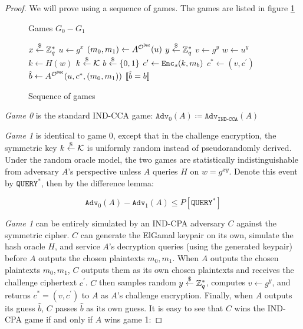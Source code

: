 \documentclass{article}
\begin{document}
\begin{proof}
    We will prove using a sequence of games. The games are listed in figure \ref{fig:cca-elgamal-sequence}

    \begin{figure}[H]
        \begin{algorithm}[H]
            \caption{Games $G_0 - G_1$}
            \begin{algorithmic}[1]
                \State $x \stackrel{\$}{\leftarrow} \mathbb{Z}_q^\ast$
                \State $u \leftarrow g^x$
                \State $(m_0, m_1) \leftarrow A^{\mathcal{O}^{\texttt{Dec}}}(u)$
                \State $y \stackrel{\$}{\leftarrow} \mathbb{Z}_q^\ast$
                \State $v \leftarrow g^y$
                \State $w \leftarrow u^y$
                \State $k \leftarrow H(w)$
                \State $k \stackrel{\$}{\leftarrow} \mathcal{K}$
                \State $b \stackrel{\$}{\leftarrow} \{0,1\}$
                \State $c^\prime \leftarrow \texttt{Enc}_s(k, m_b)$
                \State $c^\ast \leftarrow (v, c^\prime)$
                \State $\hat{b} \leftarrow A^{\mathcal{O}^{\texttt{Dec}}}(u, c^\ast, (m_0, m_1))$
                \State \Return $[\![ \hat{b} = b ]\!]$
            \end{algorithmic}
        \end{algorithm}
        \caption{Sequence of games}\label{fig:cca-elgamal-sequence}
    \end{figure}

    \emph{Game 0} is the standard IND-CCA game: $\texttt{Adv}_0(A) \coloneq \texttt{Adv}_\texttt{IND-CCA}(A)$

    \emph{Game 1} is identical to game 0, except that in the challenge encryption, the symmetric key $k \stackrel{\$}{\leftarrow} \mathcal{K}$ is uniformly random instead of pseudorandomly derived. Under the random oracle model, the two games are statistically indistinguishable from adversary $A$'s perspective unless $A$ queries $H$ on $w = g^{xy}$. Denote this event by $\texttt{QUERY}^\ast$, then by the difference lemma:

    \begin{equation*}
        \texttt{Adv}_0(A) - \texttt{Adv}_1(A) \leq P\left\lbrack \texttt{QUERY}^\ast \right\rbrack
    \end{equation*}

    \emph{Game 1} can be entirely simulated by an IND-CPA adversary $C$ against the symmetric cipher. $C$ can generate the ElGamal keypair on its own, simulate the hash oracle $H$, and service $A$'s decryption queries (using the generated keypair) before $A$ outputs the chosen plaintexts $m_0, m_1$. When $A$ outputs the chosen plaintexts $m_0, m_1$, $C$ outputs them as its own chosen plaintexts and receives the challenge ciphertext $c^\prime$. $C$ then samples random $y \stackrel{\$}{\leftarrow} \mathbb{Z}_q^\ast$, computes $v \leftarrow g^y$, and returns $c^\ast = (v, c^\prime)$ to $A$ as $A$'s challenge encryption. Finally, when $A$ outputs its guess $\hat{b}$, $C$ passes $\hat{b}$ as its own guess. It is easy to see that $C$ wins the IND-CPA game if and only if $A$ wins game 1:


\end{proof}
\end{document}
